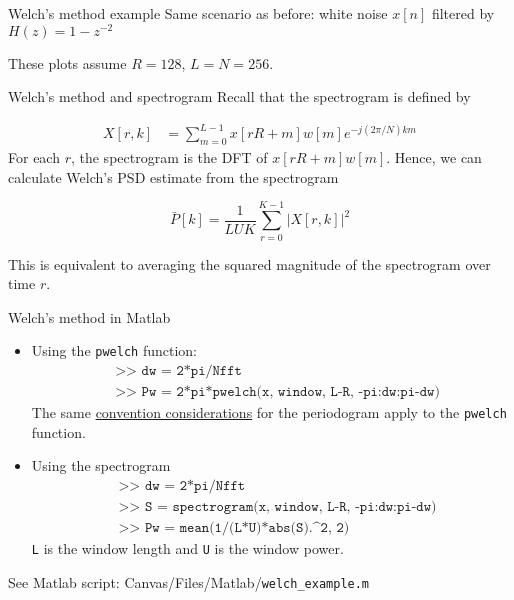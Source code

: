 \documentclass[10pt, aspectratio=169, handout]{beamer}
\begin{document}
%
\begin{frame}{Welch's method example}
Same scenario as before: white noise $x[n]$ filtered by $H(z) = 1 - z^{-2}$

These plots assume $R = 128$, $L = N = 256$.
\begin{center}
	\resizebox{0.7\textwidth}{!}{}
\end{center}
\end{frame}

%
\begin{frame}{Welch's method and spectrogram}
Recall that the spectrogram is defined by

\begin{align*}
	X[r, k] &= \sum_{m = 0}^{L-1}x[rR+m]w[m]e^{-j(2\pi/N)km} \tag{spectrogram}
\end{align*}
For each $r$, the spectrogram is the DFT of $x[rR+m]w[m]$. Hence, we can calculate Welch's PSD estimate from the spectrogram

\begin{equation*}
	\bar{P}[k] = \frac{1}{LUK} \sum_{r = 0}^{K-1} |X[r, k]|^2 \tag{Welch's PSD estimate}
\end{equation*}

This is equivalent to averaging the squared magnitude of the spectrogram over time $r$.

\end{frame}

%
\begin{frame}{Welch's method in Matlab}
\begin{itemize}
	\item Using the \texttt{pwelch} function:
	\begin{align*}
	& \texttt{>> dw = 2*pi/Nfft} \\
	& \texttt{>> Pw = 2*pi*pwelch(x, window, L-R, -pi:dw:pi-dw)} \tag{two-sided PSD estimate}
	\end{align*}
	The same \underline{convention considerations} for the periodogram apply to the \texttt{pwelch} function.
	
	\item Using the spectrogram
	\begin{align*}
		& \texttt{>> dw = 2*pi/Nfft} \\
		& \texttt{>> S = spectrogram(x, window, L-R, -pi:dw:pi-dw)}\\
		& \texttt{>> Pw = mean(1/(L*U)*abs(S).\textasciicircum 2, 2)} \tag{two-sided PSD estimate}
	\end{align*}
	\texttt{L} is the window length and \texttt{U} is the window power.
\end{itemize}

\vspace{0.25cm}
See Matlab script: Canvas/Files/Matlab/\texttt{welch\_example.m}
\end{frame}
\end{document}
